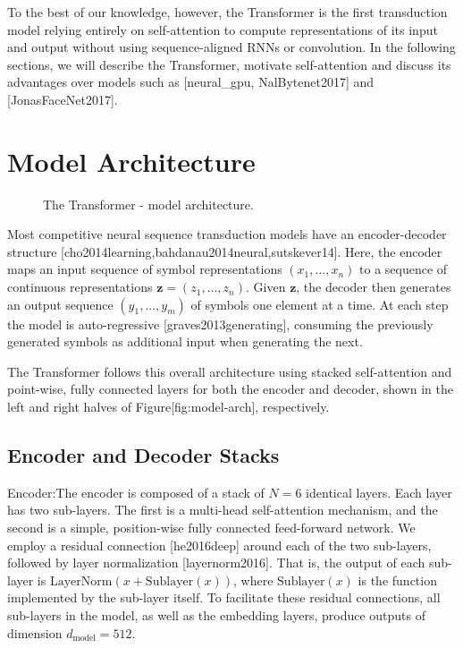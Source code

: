 \documentclass[11pt,a4paper]{article}
\begin{document}
To the best of our knowledge, however, the Transformer is the first transduction model relying entirely on self-attention to compute representations of its input and output without using sequence-aligned RNNs or convolution. In the following sections, we will describe the Transformer, motivate self-attention and discuss its advantages over models such as [neural\_gpu, NalBytenet2017] and [JonasFaceNet2017].

\section{Model Architecture}

\begin{figure}[h]
\caption{The Transformer - model architecture.}
\end{figure}

Most competitive neural sequence transduction models have an encoder-decoder structure [cho2014learning,bahdanau2014neural,sutskever14]. Here, the encoder maps an input sequence of symbol representations $(x_1, ..., x_n)$ to a sequence of continuous representations $\mathbf{z} = (z_1, ..., z_n)$. Given $\mathbf{z}$, the decoder then generates an output sequence $(y_1,...,y_m)$ of symbols one element at a time. At each step the model is auto-regressive [graves2013generating], consuming the previously generated symbols as additional input when generating the next.

The Transformer follows this overall architecture using stacked self-attention and point-wise, fully connected layers for both the encoder and decoder, shown in the left and right halves of Figure[fig:model-arch], respectively.

\subsection{Encoder and Decoder Stacks}

Encoder:The encoder is composed of a stack of $N=6$ identical layers. Each layer has two sub-layers. The first is a multi-head self-attention mechanism, and the second is a simple, position-wise fully connected feed-forward network.   We employ a residual connection [he2016deep] around each of the two sub-layers, followed by layer normalization [layernorm2016].  That is, the output of each sub-layer is $\mathrm{LayerNorm}(x + \mathrm{Sublayer}(x))$, where $\mathrm{Sublayer}(x)$ is the function implemented by the sub-layer itself.  To facilitate these residual connections, all sub-layers in the model, as well as the embedding layers, produce outputs of dimension $d_{\text{model}}=512$.
\end{document}
